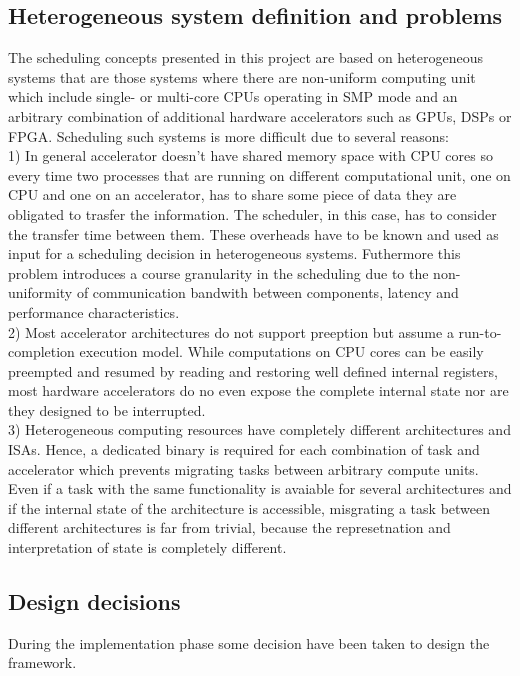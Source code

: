 \documentclass[a4paper,13pt]{article}
\begin{document}
\begin{multicols}{2}
\subsection{Heterogeneous system definition and problems}
The scheduling concepts presented in this project are based on heterogeneous systems that are 
those systems where there are non-uniform  computing unit which include single- or multi-core CPUs
operating in SMP mode and an arbitrary combination of additional hardware accelerators such as GPUs,
DSPs or FPGA.
Scheduling such systems is more difficult due to several reasons:\\
1) In general accelerator doesn't have shared memory space with CPU cores so every time two processes 
that are running on different computational unit, one on CPU and one on an accelerator, has to share
some piece of data they are obligated to trasfer the information. The scheduler, in this case, has to 
consider the transfer time between them. These overheads have to be known and used as input for a
scheduling decision in heterogeneous systems. Futhermore this problem introduces a course granularity 
in the scheduling due to the non-uniformity of communication bandwith between components, latency and
performance characteristics.\\
2) Most accelerator architectures do not support preeption but assume a run-to-completion execution
model. While computations on CPU cores can be easily preempted and resumed by reading and restoring
well defined internal registers, most hardware accelerators do no even expose the complete internal
state nor are they designed to be interrupted.\\
3) Heterogeneous computing resources have completely different architectures and ISAs. Hence, 
a dedicated binary is required for each combination of task and accelerator which prevents migrating 
tasks between arbitrary compute units. Even if a task with the same functionality is avaiable for
several architectures and if the internal state of the architecture is accessible, misgrating a task
between different architectures is far from trivial, because the represetnation and interpretation of 
state is completely different.

\subsection{Design decisions}
During the implementation phase some decision have been taken to design the framework. \\


\end{multicols}
\end{document}
